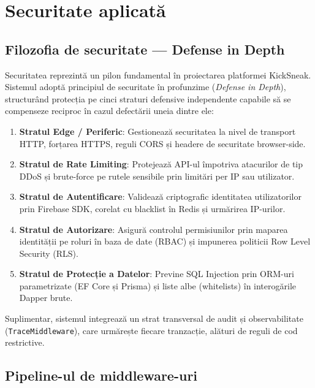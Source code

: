 \chapter{Securitate aplicată}

\section{Filozofia de securitate --- Defense in Depth}

Securitatea reprezintă un pilon fundamental în proiectarea platformei KickSneak. Sistemul adoptă principiul de securitate în profunzime (\textit{Defense in Depth}), structurând protecția pe cinci straturi defensive independente capabile să se compenseze reciproc în cazul defectării uneia dintre ele:
\begin{enumerate}
    \item \textbf{Stratul Edge / Periferic}: Gestionează securitatea la nivel de transport HTTP, forțarea HTTPS, reguli CORS și headere de securitate browser-side.
    \item \textbf{Stratul de Rate Limiting}: Protejează API-ul împotriva atacurilor de tip DDoS și brute-force pe rutele sensibile prin limitări per IP sau utilizator.
    \item \textbf{Stratul de Autentificare}: Validează criptografic identitatea utilizatorilor prin Firebase SDK, corelat cu blacklist în Redis și urmărirea IP-urilor.
    \item \textbf{Stratul de Autorizare}: Asigură controlul permisiunilor prin maparea identității pe roluri în baza de date (RBAC) și impunerea politicii Row Level Security (RLS).
    \item \textbf{Stratul de Protecție a Datelor}: Previne SQL Injection prin ORM-uri parametrizate (EF Core și Prisma) și liste albe (whitelists) în interogările Dapper brute.
\end{enumerate}

Suplimentar, sistemul integrează un strat transversal de audit și observabilitate (\texttt{TraceMiddleware}), care urmărește fiecare tranzacție, alături de reguli de cod restrictive.

\section{Pipeline-ul de middleware-uri}

